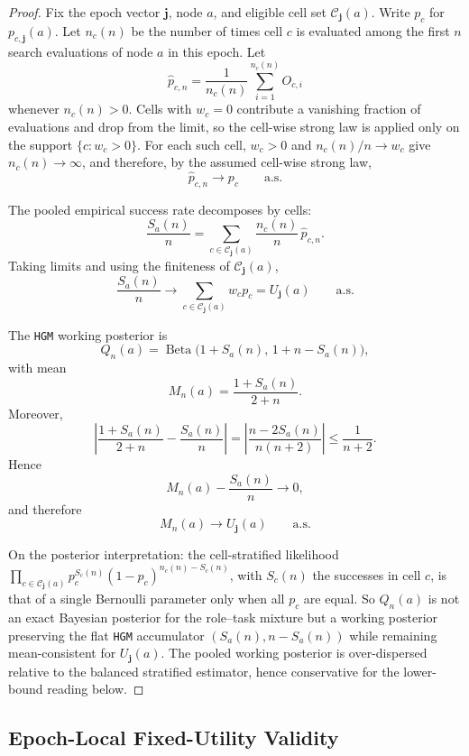 \documentclass{paper}
\newcommand{\hgm}{\texttt{HGM}\xspace}
\begin{document}
\begin{proof}
Fix the epoch vector \(\boldsymbol{j}\), node \(a\), and eligible cell set
\(\mathcal C_{\boldsymbol{j}}(a)\). Write \(p_c\) for \(p_{c,\boldsymbol{j}}(a)\).
Let \(n_c(n)\) be the number of times cell \(c\) is evaluated among the first
\(n\) search evaluations of node \(a\) in this epoch. Let
\[
\widehat p_{c,n}
=
\frac{1}{n_c(n)}
\sum_{i=1}^{n_c(n)} O_{c,i}
\]
whenever \(n_c(n)>0\). Cells with \(w_c=0\) contribute a vanishing fraction of evaluations and drop from the limit, so the cell-wise strong law is applied only on the support \(\{c:w_c>0\}\). For each such cell, \(w_c>0\) and \(n_c(n)/n\to w_c\) give \(n_c(n)\to\infty\), and therefore, by the assumed cell-wise strong law,
\[
\widehat p_{c,n}
\longrightarrow
p_c
\qquad\text{a.s.}
\]

The pooled empirical success rate decomposes by cells:
\[
\frac{S_a(n)}{n}
=
\sum_{c\in \mathcal C_{\boldsymbol{j}}(a)}
\frac{n_c(n)}{n}\,
\widehat p_{c,n}.
\]
Taking limits and using the finiteness of \(\mathcal C_{\boldsymbol{j}}(a)\),
\[
\frac{S_a(n)}{n}
\longrightarrow
\sum_{c\in \mathcal C_{\boldsymbol{j}}(a)}
w_c p_c
=
U_{\boldsymbol{j}}(a)
\qquad\text{a.s.}
\]

The \hgm working posterior is
\[
Q_n(a)
=
\operatorname{Beta}\bigl(1+S_a(n),\,1+n-S_a(n)\bigr),
\]
with mean
\[
M_n(a)
=
\frac{1+S_a(n)}{2+n}.
\]
Moreover,
\[
\left|
\frac{1+S_a(n)}{2+n}
-
\frac{S_a(n)}{n}
\right|
=
\left|
\frac{n-2S_a(n)}{n(n+2)}
\right|
\le
\frac{1}{n+2}.
\]
Hence
\[
M_n(a)-\frac{S_a(n)}{n}\longrightarrow 0,
\]
and therefore
\[
M_n(a)
\longrightarrow
U_{\boldsymbol{j}}(a)
\qquad\text{a.s.}
\]

On the posterior interpretation: the cell-stratified likelihood
\(\prod_{c\in\mathcal C_{\boldsymbol{j}}(a)} p_c^{S_c(n)}(1-p_c)^{n_c(n)-S_c(n)}\), with
\(S_c(n)\) the successes in cell \(c\), is that of a single Bernoulli parameter
only when all \(p_c\) are equal. So \(Q_n(a)\) is not an exact Bayesian posterior
for the role--task mixture but a working posterior preserving the flat \hgm
accumulator \((S_a(n),n-S_a(n))\) while remaining mean-consistent for \(U_{\boldsymbol{j}}(a)\).
The pooled working posterior is over-dispersed relative to the balanced
stratified estimator, hence conservative for the lower-bound reading below.
\end{proof}




\subsection{Epoch-Local Fixed-Utility Validity}
\label{app:proofs:epoch-local-validity}
\end{document}
